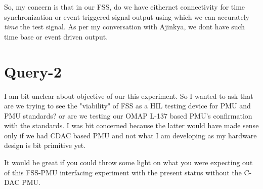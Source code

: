\documentclass{article}
\begin{document}
So, my concern is that in our FSS, do we have eithernet connectivity for time synchronization or event triggered signal output using which we can accurately \textit{time } the test signal. As per my conversation with Ajinkya, we dont have such time base or event driven output.

\section{Query-2}

I am bit unclear about objective of our this experiment. So I wanted to ask that are we trying to see the "viability" of FSS as a HIL testing device for PMU and PMU standards? or are we testing our OMAP L-137 based PMU's confirmation with the standards. 
I was bit concerned because the latter would have made sense only if we had CDAC based PMU and not what I am developing as my hardware design is bit primitive yet.

It would be great if you could throw some light on what you were expecting out of this FSS-PMU interfacing experiment with the present status without the C-DAC PMU. 
\end{document}
